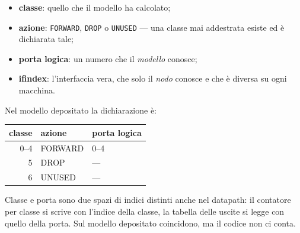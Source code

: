 \documentclass[11pt,a4paper,oneside]{report}
\begin{document}
\begin{center}
\end{center}

\begin{itemize}
\item \textbf{classe}: quello che il modello ha calcolato;
\item \textbf{azione}: \texttt{FORWARD}, \texttt{DROP} o \texttt{UNUSED} --- una
      classe mai addestrata esiste ed è dichiarata tale;
\item \textbf{porta logica}: un numero che il \emph{modello} conosce;
\item \textbf{ifindex}: l'interfaccia vera, che solo il \emph{nodo} conosce e
      che è diversa su ogni macchina.
\end{itemize}

Nel modello depositato la dichiarazione è:

\begin{center}
\small
\begin{tabular}{@{}rll@{}}
\toprule
\textbf{classe} & \textbf{azione} & \textbf{porta logica} \\
\midrule
0--4 & FORWARD & 0--4 \\
5    & DROP    & --- \\
6    & UNUSED  & --- \\
\bottomrule
\end{tabular}
\end{center}

Classe e porta sono due spazi di indici distinti anche nel datapath: il
contatore per classe si scrive con l'indice della classe, la tabella delle
uscite si legge con quello della porta. Sul modello depositato coincidono, ma il
codice non ci conta.
\end{document}
